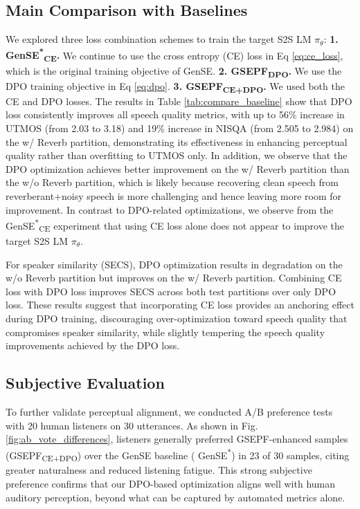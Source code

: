 \documentclass{article}
\begin{document}
\subsection{Main Comparison with Baselines}
We explored three loss combination schemes to train the target S2S LM $\pi_\theta$: \textbf{1. GenSE\textsuperscript{*}\textsubscript{CE}.} We continue to use the cross entropy (CE) loss in Eq \ref{eq:ce_loss}, which is the original training objective of GenSE. \textbf{2. GSEPF\textsubscript{DPO}.} We use the DPO training objective in Eq \ref{eq:dpo}. \textbf{3. GSEPF\textsubscript{CE+DPO}.} We used both the CE and DPO losses. The results in Table \ref{tab:compare_baseline} show that DPO loss consistently improves all speech quality metrics, with up to 56\% increase in UTMOS (from 2.03 to 3.18) and 19\% increase in NISQA (from 2.505 to 2.984) on the w/ Reverb partition, demonstrating its effectiveness in enhancing perceptual quality rather than overfitting to UTMOS only. In addition, we observe that the DPO optimization achieves better improvement on the w/ Reverb partition than the w/o Reverb partition, which is likely because recovering clean speech from reverberant+noisy speech is more challenging and hence leaving more room for improvement. In contrast to DPO-related optimizations, we observe from the GenSE\textsuperscript{*}\textsubscript{CE} experiment that using CE loss alone does not appear to improve the target S2S LM $\pi_\theta$.  

For speaker similarity (SECS), DPO optimization results in degradation on the w/o Reverb partition but improves on the w/ Reverb partition. Combining CE loss with DPO loss improves SECS across both test partitions over only DPO loss. These results suggest that incorporating CE loss provides an anchoring effect during DPO training, discouraging over-optimization toward speech quality that compromises speaker similarity, while slightly tempering the speech quality improvements achieved by the DPO loss.

\subsection{Subjective Evaluation}
To further validate perceptual alignment, we conducted A/B preference tests with 20 human listeners on 30 utterances. As shown in Fig. \ref{fig:ab_vote_differences}, listeners generally preferred GSEPF-enhanced samples (GSEPF\textsubscript{CE+DPO}) over the GenSE baseline ( GenSE\textsuperscript{*}) in 23 of 30 samples, citing greater naturalness and reduced listening fatigue. This strong subjective preference confirms that our DPO-based optimization aligns well with human auditory perception, beyond what can be captured by automated metrics alone.
\end{document}
